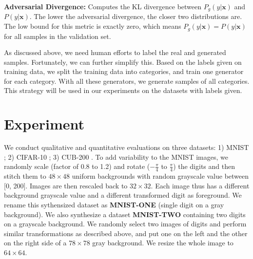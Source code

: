 \documentclass{article} \usepackage{iclr2017_conference,times}
\begin{document}
\textbf{Adversarial Divergence:} Computes the KL divergence between $P_g(y|\bm{x})$ and $P(y|\bm{x})$. The lower the adversarial divergence, the closer two distributions are. The low bound for this metric is exactly zero, which means $P_g(y|\bm{x}) = P(y|\bm{x})$ for all samples in the validation set. 

As discussed above, we need human efforts to label the real and generated samples. Fortunately, we can further simplify this. Based on the labels given on training data, we split the training data into categories, and train one generator for each category. With all these generators, we generate samples of all categories. This strategy will be used in our experiments on the datasets with labels given.




 
%
 

\section{Experiment}
\vspace{-5pt}
We conduct qualitative and quantitative evaluations on three datasets: 1) MNIST \citep{MNIST}; 2) CIFAR-10 \citep{CIFAR10}; 3) CUB-200 \citep{CUB200}. To add variability to the MNIST images, we randomly scale (factor of 0.8 to 1.2) and rotate ($-\frac{\pi}{4}$ to $\frac{\pi}{4}$) the digits and then stitch them to $48 \times 48$ uniform backgrounds with random grayscale value between [0, 200]. Images are then rescaled back to $32 \times 32$. Each image thus has a different background grayscale value and a different transformed digit as foreground. We rename this sythensized dataset as \textbf{MNIST-ONE} (single digit on a gray background). We also synthesize a dataset \textbf{MNIST-TWO} containing two digits on a grayscale background. We randomly select two images of digits and perform similar transformations as described above, and put one on the left and the other on the right side of a $78 \times 78$ gray background. We resize the whole image to $64 \times 64$.
\end{document}
